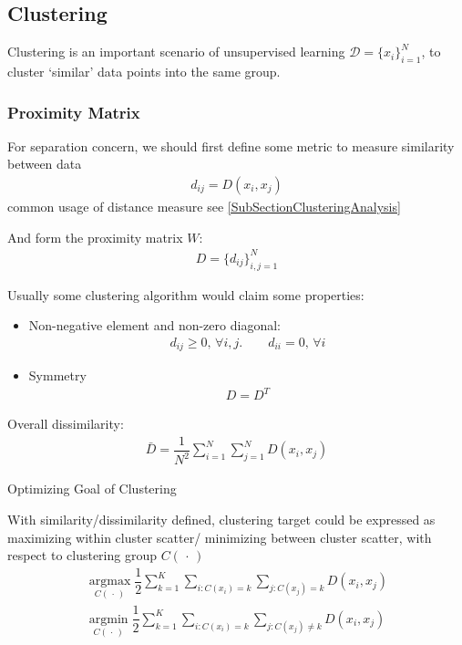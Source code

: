 \subsection{Clustering}
    Clustering is an important scenario of unsupervised learning $ \mathcal{D}=\{x_i\}_{i=1}^N $, to cluster `similar' data points into the same group. 

\subsubsection{Proximity Matrix}
    For separation concern, we should first define some metric to measure similarity between data
    \begin{align}
        d_{ij}=D(x_i,x_j) 
    \end{align}
    common usage of distance measure see \autoref{SubSectionClusteringAnalysis}
    
    And form the proximity matrix $ W $:
    \begin{align}
    D=\{d_{ij}\}_{i,j=1}^N 
    \end{align}
    
    Usually some clustering algorithm would claim some properties:
\begin{itemize}[topsep=2pt,itemsep=0pt]
    \item Non-negative element and non-zero diagonal:
    \begin{align}
        d_{ij}\geq 0,\,\forall i,j.\qquad d_{ii}=0,\,\forall i 
    \end{align}
    \item Symmetry
    \begin{align}
        D=D^T 
    \end{align}
\end{itemize}

    Overall dissimilarity:
    \begin{align}
        \bar{D}=\dfrac{1}{N^2}\sum_{i=1}^N\sum_{j=1}^ND(x_i,x_j) 
    \end{align}

\begin{point}
    Optimizing Goal of Clustering
\end{point}

    With similarity/dissimilarity defined, clustering target could be expressed as maximizing within cluster scatter/ minimizing between cluster scatter, with respect to clustering group $ C(\, \cdot \, ) $
    \begin{align}
        \mathop{\arg\max}\limits_{C(\, \cdot \, )}\dfrac{1}{2}\sum_{k=1}^K\sum_{i:C(x_i)=k}\sum_{j:C(x_j)=k}D(x_i,x_j)\\
        \mathop{\arg\min}\limits_{C(\, \cdot \, )}\dfrac{1}{2}\sum_{k=1}^K\sum_{i:C(x_i)=k}\sum_{j:C(x_j)\neq k}D(x_i,x_j)
    \end{align}

